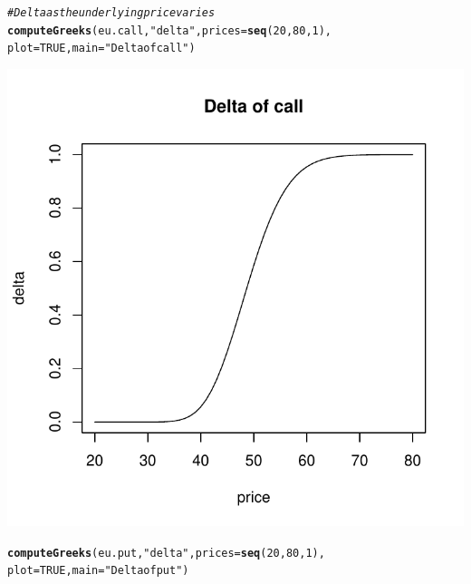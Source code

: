 \documentclass{article}\usepackage[]{graphicx}\usepackage[]{color}
\makeatletter
\def\maxwidth{ %
  \ifdim\Gin@nat@width>\linewidth
    \linewidth
  \else
    \Gin@nat@width
  \fi
}
\newcommand{\hlstr}[1]{\textcolor[rgb]{0.192,0.494,0.8}{#1}}%
\newcommand{\hlcom}[1]{\textcolor[rgb]{0.678,0.584,0.686}{\textit{#1}}}%
\newcommand{\hlkwd}[1]{\textcolor[rgb]{0.737,0.353,0.396}{\textbf{#1}}}%
\newenvironment{kframe}{%
 \def\at@end@of@kframe{}%
 \ifinner\ifhmode%
  \def\at@end@of@kframe{\end{minipage}}%
  \begin{minipage}{\columnwidth}%
 \fi\fi%
 \def\FrameCommand##1{\hskip\@totalleftmargin \hskip-\fboxsep
 \colorbox{shadecolor}{##1}\hskip-\fboxsep
     \hskip-\linewidth \hskip-\@totalleftmargin \hskip\columnwidth}%
 \MakeFramed {\advance\hsize-\width
   \@totalleftmargin\z@ \linewidth\hsize
   \@setminipage}}%
 {\par\unskip\endMakeFramed%
 \at@end@of@kframe}
\newenvironment{knitrout}{}{} %
\makeatother
\begin{document}
\begin{knitrout}
\color{fgcolor}\begin{kframe}
\begin{alltt}
\hlcom{# Delta as the underlying price varies}
\hlkwd{computeGreeks}(eu.call, \hlstr{"delta"}, prices = \hlkwd{seq}(20, 80, 1), 
              plot = TRUE, main=\hlstr{"Delta of call"})
\end{alltt}
\end{kframe}
\includegraphics[width=\maxwidth]{figure/unnamed-chunk-91} 
\begin{kframe}\begin{alltt}
\hlkwd{computeGreeks}(eu.put, \hlstr{"delta"}, prices = \hlkwd{seq}(20, 80, 1), 
              plot = TRUE, main=\hlstr{"Delta of put"})
\end{alltt}
\end{kframe}

\end{knitrout}
\end{document}
